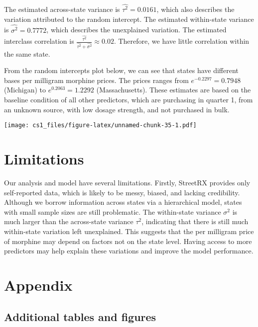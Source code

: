 \documentclass[
  11pt,
]{article}
\begin{document}
The estimated across-state variance is \(\hat{\tau^2} = 0.0161\), which
also describes the variation attributed to the random intercept. The
estimated within-state variance is \(\hat{\sigma^2} = 0.7772\), which
describes the unexplained variation. The estimated interclass
correlation is
\(\frac{\hat{\tau^2}}{\hat{\tau^2} + \hat{\sigma^2}} \approx 0.02\).
Therefore, we have little correlation within the same state.

From the random intercepts plot below, we can see that states have
different bases per milligram morphine prices. The prices ranges from
\(e^{-0.2297} = 0.7948\) (Michigan) to \(e^{0.2063} = 1.2292\)
(Massachusetts). These estimates are based on the baseline condition of
all other predictors, which are purchasing in quarter 1, from an unknown
source, with low dosage strength, and not purchased in bulk.

\texttt{[image: cs1\_files/figure-latex/unnamed-chunk-35-1.pdf]}

\hypertarget{limitations}{%
\section{Limitations}\label{limitations}}

Our analysis and model have several limitations. Firstly, StreetRX
provides only self-reported data, which is likely to be messy, biased,
and lacking credibility. Although we borrow information across states
via a hierarchical model, states with small sample sizes are still
problematic. The within-state variance \(\sigma^2\) is much larger than
the across-state variance \(\tau^2\), indicating that there is still
much within-state variation left unexplained. This suggests that the per
milligram price of morphine may depend on factors not on the state
level. Having access to more predictors may help explain these
variations and improve the model performance.

\newpage

\hypertarget{appendix}{%
\section{Appendix}\label{appendix}}

\hypertarget{additional-tables-and-figures}{%
\subsection{Additional tables and
figures}\label{additional-tables-and-figures}}
\end{document}

